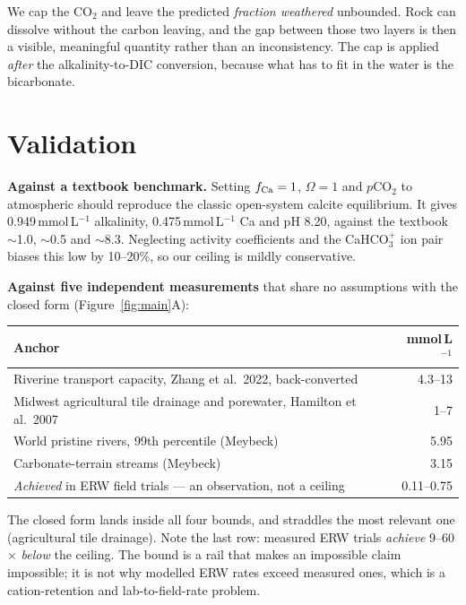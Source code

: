 \documentclass[11pt,a4paper]{article}
\newcommand{\cotwo}{CO$_2$}
\begin{document}
We cap the \cotwo{} and leave the predicted \emph{fraction weathered} unbounded.
Rock can dissolve without the carbon leaving, and the gap between those two layers
is then a visible, meaningful quantity rather than an inconsistency. The cap is
applied \emph{after} the alkalinity-to-DIC conversion, because what has to fit in
the water is the bicarbonate.

\section{Validation}

\textbf{Against a textbook benchmark.} Setting $f_{\rm Ca} = 1$, $\Omega = 1$ and
$p$\cotwo{} to atmospheric should reproduce the classic open-system calcite
equilibrium. It gives 0.949\,mmol\,L$^{-1}$ alkalinity,
0.475\,mmol\,L$^{-1}$ Ca and pH 8.20, against the textbook
$\sim$1.0, $\sim$0.5 and $\sim$8.3. Neglecting activity coefficients and the
CaHCO$_3^+$ ion pair biases this low by 10--20\%, so our ceiling is mildly
conservative.

\textbf{Against five independent measurements} that share no assumptions with the
closed form (Figure~\ref{fig:main}A):

\begin{center}
\begin{tabular}{lr}
\toprule
Anchor & mmol\,L$^{-1}$ \\
\midrule
Riverine transport capacity, Zhang et al.\ 2022, back-converted & 4.3--13 \\
Midwest agricultural tile drainage and porewater, Hamilton et al.\ 2007 & 1--7 \\
World pristine rivers, 99th percentile (Meybeck) & 5.95 \\
Carbonate-terrain streams (Meybeck) & 3.15 \\
\midrule
\textit{Achieved} in ERW field trials --- an observation, not a ceiling & 0.11--0.75 \\
\bottomrule
\end{tabular}
\end{center}

The closed form lands inside all four bounds, and straddles the most relevant one
(agricultural tile drainage). Note the last row: measured ERW trials \emph{achieve}
9--60$\times$ \emph{below} the ceiling. The bound is a rail
that makes an impossible claim impossible; it is not why modelled ERW rates exceed
measured ones, which is a cation-retention and lab-to-field-rate problem.
\end{document}
